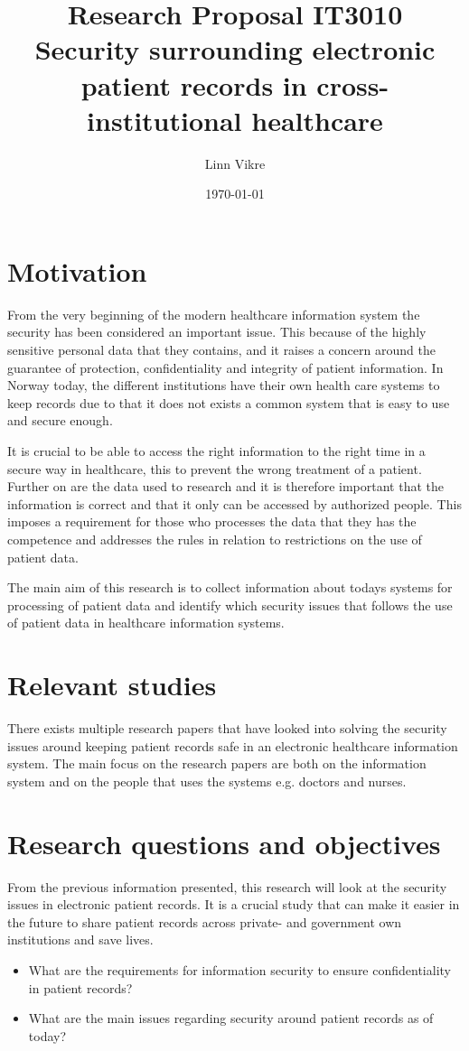 \documentclass[11pt, a4paper]{article}
\title{Research Proposal IT3010\\ Security surrounding electronic patient records in cross-institutional healthcare}
\author{Linn Vikre}
\date{\today}
\begin{document}
\maketitle
\section{Motivation}
From the very beginning of the modern healthcare information system the security has been considered an important issue. This because of the highly sensitive personal data that they contains, and it raises a concern around the guarantee of protection, confidentiality and integrity of patient information\cite{Smith199939}. In Norway today, the different institutions have their own health care systems to keep records due to that it does not exists a common system that is easy to use and secure enough.

It is crucial to be able to access the right information to the right time in a secure way in healthcare, this to prevent the wrong treatment of a patient. Further on are the data used to research and it is therefore important that the information is correct and that it only can be accessed by authorized people. This imposes a requirement for those who processes the data that they has the competence and addresses the rules in relation to restrictions on the use of patient data\cite{faxvaag2007er}. 

The main aim of this research is to collect information about todays systems for processing of patient data and identify which security issues that follows the use of patient data in healthcare information systems.

\section{Relevant studies}

There exists multiple research papers that have looked into solving the security issues around keeping patient records safe in an electronic healthcare information system. The main focus on the research papers are both on the information system and on the people that uses the systems e.g. doctors and nurses. 

\section{Research questions and objectives}

From the previous information presented, this research will look at the security issues in electronic patient records. It is a crucial study that can make it easier in the future to share patient records across private- and government own institutions and save lives. 

\begin{itemize}
\item What are the requirements for information security to ensure confidentiality in patient records?
\item What are the main issues regarding security around patient records as of today?
\end{itemize}


\end{document}
